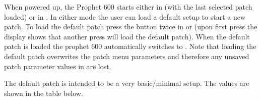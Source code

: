 When powered up, the Prophet 600 starts either in \presetmode (with the last selected patch loaded) or in \livemode. In either mode the user can load a default setup to start a new patch. To load the default patch press the \preset button twice in \shiftmode or \shiftlock (upon first press the display shows that another press will load the default patch). When the default patch is loaded the prophet 600 automatically switches to \presetpanel. Note that loading  the default patch overwrites the patch menu parameters and therefore any unsaved patch parameter values in \presetmode are lost.

The default patch is intended to be a very basic/minimal setup. The values are shown in the table below.

\footnotesize
\renewcommand{\arraystretch}{1.3}

